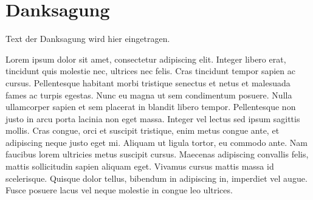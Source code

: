 \section*{Danksagung}
Text der Danksagung wird hier eingetragen.

Lorem ipsum dolor sit amet, consectetur adipiscing elit. Integer libero erat, tincidunt quis molestie nec, ultrices nec felis. Cras tincidunt tempor sapien ac cursus. Pellentesque habitant morbi tristique senectus et netus et malesuada fames ac turpis egestas. Nunc eu magna ut sem condimentum posuere. Nulla ullamcorper sapien et sem placerat in blandit libero tempor. Pellentesque non justo in arcu porta lacinia non eget massa. Integer vel lectus sed ipsum sagittis mollis. Cras congue, orci et suscipit tristique, enim metus congue ante, et adipiscing neque justo eget mi. Aliquam ut ligula tortor, eu commodo ante. Nam faucibus lorem ultricies metus suscipit cursus. Maecenas adipiscing convallis felis, mattis sollicitudin sapien aliquam eget. Vivamus cursus mattis massa id scelerisque. Quisque dolor tellus, bibendum in adipiscing in, imperdiet vel augue. Fusce posuere lacus vel neque molestie in congue leo ultrices.